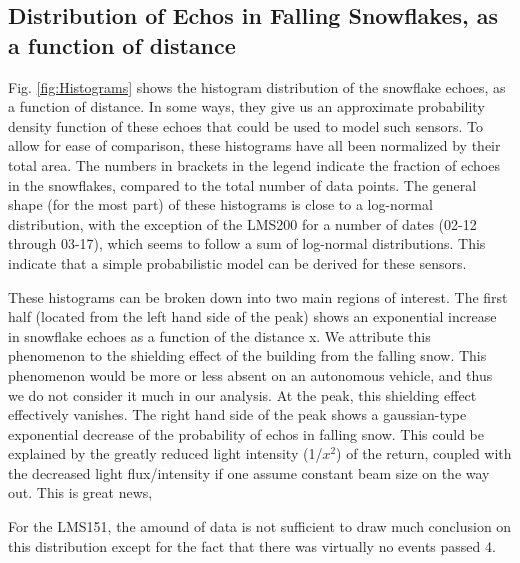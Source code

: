 \subsection{Distribution of Echos in Falling Snowflakes, as a function of distance}
\label{subsub:Histo}

Fig. \ref{fig:Histograms} shows the histogram distribution of the snowflake echoes, as a function of distance. In some ways, they give us an approximate probability density function of these echoes that could be used to model such sensors. To allow for ease of comparison, these histograms have all been normalized by their total area. The numbers in brackets in the legend indicate the fraction of echoes in the snowflakes, compared to the total number of data points. The general shape (for the most part) of these histograms is close to a log-normal distribution, with the exception of the LMS200 for a number of dates (02-12 through 03-17), which seems to follow a sum of log-normal distributions. This indicate that a simple probabilistic model can be derived for these sensors.

These histograms can be broken down into two main regions of interest. The first half (located from the left hand side of the peak) shows an exponential increase in snowflake echoes as a function of the distance x. We attribute this phenomenon to the shielding effect of the building from the falling snow. This phenomenon would be more or less absent on an autonomous vehicle, and thus we do not consider it much in our analysis. At the peak, this shielding effect effectively vanishes. The right hand side of the peak shows a gaussian-type exponential decrease of the probability of echos in falling snow. This could be explained by the greatly reduced light intensity (1/$x^2$) of the return, coupled with the decreased light flux/intensity if one assume constant beam size on the way out. This is great news, 

For the LMS151, the amound of data is not sufficient to draw much conclusion on this distribution except for the fact that there was virtually no events passed 4.


